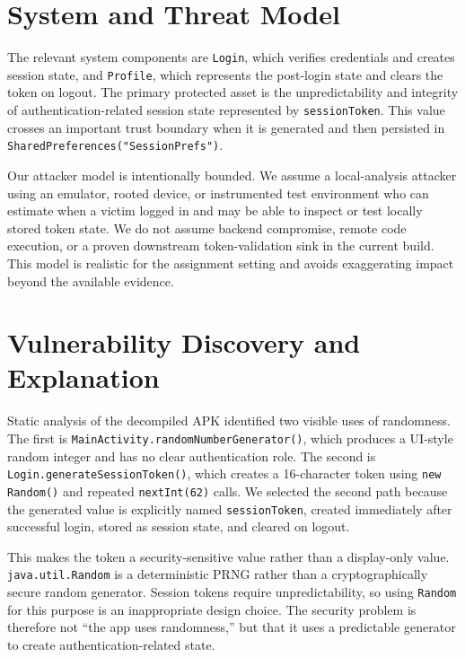 \documentclass[letterpaper,twocolumn,10pt]{article}
\begin{document}
\section{System and Threat Model}

The relevant system components are \texttt{Login}, which verifies credentials and creates session state, and \texttt{Profile}, which represents the post-login state and clears the token on logout. The primary protected asset is the unpredictability and integrity of authentication-related session state represented by \texttt{sessionToken}. This value crosses an important trust boundary when it is generated and then persisted in \texttt{SharedPreferences("SessionPrefs")}.

Our attacker model is intentionally bounded. We assume a local-analysis attacker using an emulator, rooted device, or instrumented test environment who can estimate when a victim logged in and may be able to inspect or test locally stored token state. We do not assume backend compromise, remote code execution, or a proven downstream token-validation sink in the current build. This model is realistic for the assignment setting and avoids exaggerating impact beyond the available evidence.

\section{Vulnerability Discovery and Explanation}

Static analysis of the decompiled APK identified two visible uses of randomness. The first is \texttt{MainActivity.randomNumberGenerator()}, which produces a UI-style random integer and has no clear authentication role. The second is \texttt{Login.generateSessionToken()}, which creates a 16-character token using \texttt{new Random()} and repeated \texttt{nextInt(62)} calls. We selected the second path because the generated value is explicitly named \texttt{sessionToken}, created immediately after successful login, stored as session state, and cleared on logout.

This makes the token a security-sensitive value rather than a display-only value. \texttt{java.util.Random} is a deterministic PRNG rather than a cryptographically secure random generator. Session tokens require unpredictability, so using \texttt{Random} for this purpose is an inappropriate design choice. The security problem is therefore not ``the app uses randomness,'' but that it uses a predictable generator to create authentication-related state.
\end{document}
